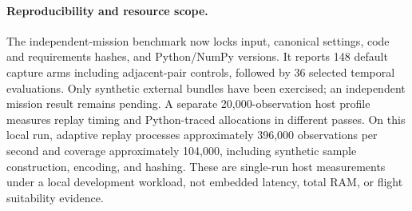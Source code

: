 \paragraph{Reproducibility and resource scope.}
The independent-mission benchmark now locks input, canonical settings, code and
requirements hashes, and Python/NumPy versions. It reports 148 default capture
arms including adjacent-pair controls, followed by 36 selected temporal evaluations.
Only synthetic external bundles have been exercised; an independent mission result
remains pending. A separate 20,000-observation host profile measures replay timing
and Python-traced allocations in different passes. On this local run, adaptive
replay processes approximately 396,000 observations per second and coverage
approximately 104,000, including synthetic sample construction, encoding, and
hashing. These are single-run host measurements under a local development
workload, not embedded latency, total RAM, or flight suitability evidence.
